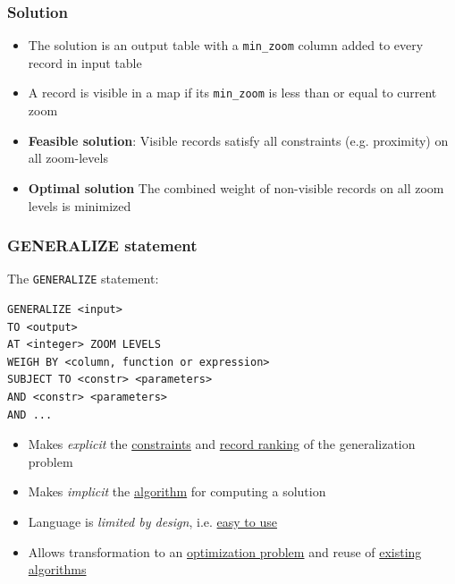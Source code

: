 \documentclass{beamer}
\begin{document}
\frame
{
  \frametitle{Solution}
  \begin{itemize}
  \item The solution is an output table with a \texttt{min\_zoom} column added to every record in input table
  \item A record is visible in a map if its \texttt{min\_zoom} is less than or equal to current zoom
  \item \textbf{Feasible solution}: Visible records satisfy all constraints (e.g. proximity) on all zoom-levels
  \item \textbf{Optimal solution} The combined weight of non-visible records on all zoom levels is minimized
  \end{itemize}
  \begin{center}
  \end{center}
}




\begin{frame}[fragile,t]
  \frametitle{GENERALIZE statement}

The \texttt{GENERALIZE} statement:
\begin{lstlisting}
GENERALIZE <input> 
TO <output> 
AT <integer> ZOOM LEVELS
WEIGH BY <column, function or expression>
SUBJECT TO <constr> <parameters>
AND <constr> <parameters>
AND ...
\end{lstlisting}    
\begin{itemize}
\item Makes \emph{explicit} the \underline{constraints} and \underline{record ranking} of the generalization problem
\item Makes \emph{implicit} the \underline{algorithm} for computing a solution
\item Language is \emph{limited by design}, i.e. \underline{easy to use}
\item Allows transformation to an \underline{optimization problem} and reuse of \underline{existing algorithms}
\end{itemize}
\end{frame}
\end{document}
